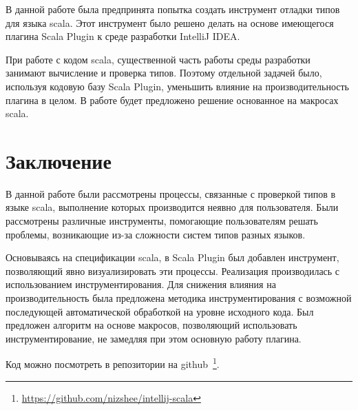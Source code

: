 \documentclass{spbau-diploma}
\begin{document}
В данной работе была предпринята попытка создать инструмент отладки типов для
языка scala.
Этот инструмент было решено делать на основе имеющегося плагина Scala Plugin к
среде разработки IntelliJ IDEA.

При работе с кодом scala, существенной часть работы среды
разработки занимают вычисление и проверка типов.
Поэтому отдельной задачей было, используя кодовую базу Scala Plugin,
уменьшить влияние на производительность плагина в целом.
В работе будет предложено решение основанное на макросах scala.





\section*{Заключение}

В данной работе были рассмотрены процессы, связанные с проверкой типов в
языке scala, выполнение которых производится неявно для пользователя.
Были рассмотрены различные инструменты, помогающие пользователям решать
проблемы, возникающие из-за сложности систем типов разных языков.

Основываясь на спецификации scala, в Scala Plugin был добавлен инструмент,
позволяющий явно визуализировать эти процессы.
Реализация производилась с использованием инструментирования.
Для снижения влияния на производительность была предложена методика
инструментирования с возможной последующей автоматической обработкой на
уровне исходного кода.
Был предложен алгоритм на основе макросов, позволяющий использовать
инструментирование, не замедляя при этом основную работу плагина.

Код можно посмотреть в репозитории на
github~\footnote{\url{https://github.com/nizshee/intellij-scala}}.


\setmonofont[Mapping=tex-text]{CMU Typewriter Text}




\end{document}
